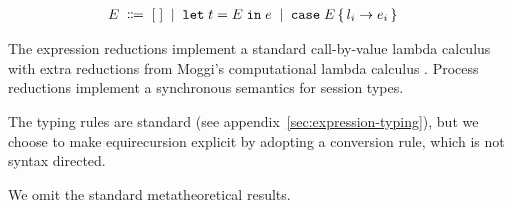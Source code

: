 \begin{align*}
  E \grmdef&
    \EHole \grmor
    \ELet t E e \grmor
    \ECase E { l_i \rightarrow e_i }
\end{align*}



The expression reductions implement a standard call-by-value lambda
calculus with extra reductions from Moggi's computational lambda
calculus \cite{DBLP:conf/lics/Moggi89}. Process reductions implement a synchronous semantics for
session types.

The typing rules are standard (see appendix~\ref{sec:expression-typing}), but we choose to make
equirecursion explicit by adopting a conversion rule, which is not
syntax directed.
\begin{mathpar}
\end{mathpar}

We omit the standard metatheoretical results.

% 

